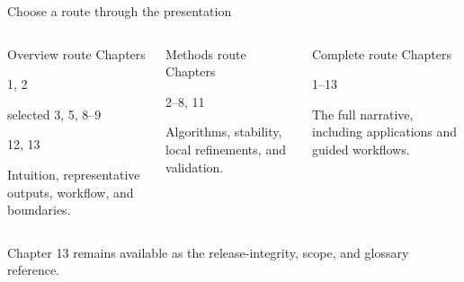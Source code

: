 \begin{frame}{Choose a route through the presentation}
\begin{columns}[T,onlytextwidth]
\begin{block}{Overview route}
\centering
\small Chapters

\Large 1, 2

\normalsize selected 3, 5, 8--9

\Large 12, 13

\vspace{2mm}
\small Intuition, representative outputs, workflow, and boundaries.
\end{block}

\begin{block}{Methods route}
\centering
\small Chapters

\Large 2--8, 11

\vspace{8.4mm}
\small Algorithms, stability, local refinements, and validation.
\end{block}

\begin{block}{Complete route}
\centering
\small Chapters

\Large 1--13

\vspace{8.4mm}
\small The full narrative, including applications and guided workflows.
\end{block}
\end{columns}

\vfill
\centering
\textcolor{JaxTeal}{Chapter 13 remains available as the release-integrity, scope, and glossary reference.}
\end{frame}

